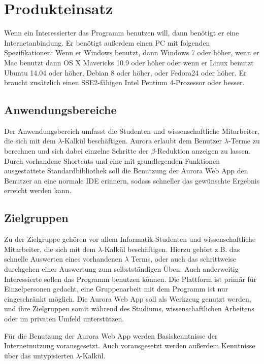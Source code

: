 \documentclass[parskip=full,11pt,twoside]{scrartcl}
\begin{document}
\newpage
\section{Produkteinsatz}

Wenn ein Interessierter das Programm benutzen will, dann benötigt er eine Internetanbindung. Er benötigt  außerdem einen PC mit folgenden Spezifikationen: Wenn er Windows benutzt, dann Windows 7 oder höher, wenn er Mac benutzt dann OS X Mavericks 10.9 oder höher oder wenn er Linux benutzt Ubuntu 14.04 oder höher, Debian 8 oder höher, oder Fedora24 oder höher.
Er braucht zusätzlich einen SSE2-fähigen Intel Pentium 4-Prozessor oder besser.

\subsection{Anwendungsbereiche}

Der Anwendungsbereich umfasst die Studenten und wissenschaftliche Mitarbeiter, die sich mit dem $\lambda$-Kalkül beschäftigen. Aurora erlaubt dem Benutzer $\lambda$-Terme zu berechnen und sich dabei einzelne Schritte der $\beta$-Reduktion anzeigen zu lassen. Durch vorhandene Shortcuts und eine mit grundlegenden Funktionen ausgestattete Standardbibliothek soll die Benutzung der Aurora Web App den Benutzer an eine normale IDE erinnern, sodass schneller das gewünschte Ergebnis erreicht werden kann.

\subsection{Zielgruppen}

Zu der Zielgruppe gehören vor allem Informatik-Studenten und wissenschaftliche Mitarbeiter, die sich mit dem $\lambda$-Kalkül beschäftigen. Hierzu gehört z.B. das schnelle Auswerten eines vorhandenen $\lambda$ Terms, oder auch das schrittweise durchgehen einer Auswertung zum selbstständigen Üben. Auch anderweitig Interessierte sollen das Programm benutzen können.
Die Plattform ist primär für Einzelpersonen gedacht, eine Gruppenarbeit mit dem Programm ist nur eingeschränkt möglich. Die Aurora Web App soll als Werkzeug genutzt werden, und ihre Zielgruppen somit während des Studiums, wissenschaftlichen Arbeitens oder im privaten Umfeld unterstützen.


Für die Benutzung der Aurora Web App werden Basiskenntnisse der Internetnutzung vorausgesetzt. Auch vorausgesetzt werden außerdem Kenntnisse über das untypisierten $\lambda$-Kalkül.
\end{document}
